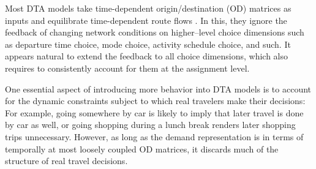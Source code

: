 %

%




Most DTA models take time-dependent origin/destination (OD) matrices 
as inputs and equilibrate time-dependent route flows \citep{peeta-2001}.
In this, they ignore the feedback of changing network conditions on
higher--level choice dimensions such as departure time choice, mode
choice, activity schedule choice, and such. It appears natural to
extend the feedback to all choice dimensions, which also requires to
consistently account for them at the assignment level.


One essential aspect of introducing more behavior into DTA
models is to account for the dynamic constraints subject
to which real travelers make their decisions: For example,
going somewhere by car is likely to imply that later travel is done by
car as well, or going shopping during a lunch break renders later
shopping trips unnecessary.  However, as long as the demand
representation is in terms of temporally at most loosely coupled OD
matrices, it discards much of the structure of real travel decisions.

%


